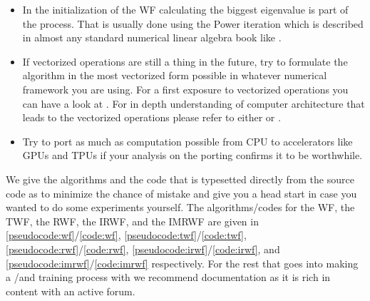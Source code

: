 \begin{itemize}
  \item In the initialization of the \ac{WF} calculating the biggest eigenvalue is part of the process. That is usually done using the Power iteration which is 
  described in almost any standard numerical linear algebra book like \cite{Trefethen2022}. 
  \item If vectorized operations are still a thing in the future, try to formulate the algorithm in the most vectorized form possible in whatever 
  numerical framework you are using. For a first exposure to vectorized operations you can have a look at \cite{Hager2010}. For in depth understanding of 
  computer architecture that leads to the vectorized operations please refer to either \cite{Patterson2014} or \cite{Hennessy2019}.
  \item Try to port as much as computation possible from \ac{CPU} to accelerators like \ac{GPU}s and \ac{TPU}s if 
  your analysis on the porting confirms it to be worthwhile.
\end{itemize}

We give the algorithms and the code that is typesetted directly from the source code as to minimize the chance of mistake and give you a head start in case you wanted to do some experiments yourself. 
The algorithms/codes for the \ac{WF}, the \ac{TWF}, the \ac{RWF}, the \ac{IRWF}, and the \ac{IMRWF} are given in \cref{pseudocode:wf}/\cref{code:wf}, \cref{pseudocode:twf}/\cref{code:twf}, 
\cref{pseudocode:rwf}/\cref{code:rwf}, \cref{pseudocode:irwf}/\cref{code:irwf}, and \cref{pseudocode:imrwf}/\cref{code:imrwf} respectively. For the rest that 
goes into making a \ml/\dl and training process with \pytorch we recommend \pytorch documentation as it is rich in content with an active forum. 



